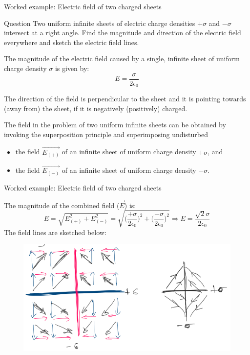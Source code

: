{
\problemslide

\begin{frame}{Worked example: Electric field of two charged sheets}

  \begin{blockexmplque}{Question}
       Two uniform infinite sheets of electric charge densities
       $+\sigma$ and $-\sigma$ intersect at a right angle.
       Find the magnitude and direction of the electric field everywhere
       and sketch the electric field lines.
  \end{blockexmplque}

  The magnitude of the electric field caused by a single, infinite sheet
  of uniform charge density $\sigma$ is given by:
  \begin{equation*}
     E = \frac{\sigma}{2\epsilon_0}
  \end{equation*}

  The direction of the field is perpendicular to the sheet and it is pointing
  towards (away from) the sheet, if it is negatively (positively) charged.

  The field in the problem of two uniform infinite sheets
  can be obtained by invoking the superposition principle
  and superimposing undisturbed
  \begin{itemize}
  \item
  the field $\vec{E_(+)}$
  of an infinite sheet of uniform charge density $+\sigma$, and
  \item
  the field $\vec{E_(-)}$
  of an infinite sheet of uniform charge density $-\sigma$.
  \end{itemize}

\end{frame}

%
%
%

\begin{frame}{Worked example: Electric field of two charged sheets}

  The magnitude of the combined field ($\vec{E}$) is:
  \begin{equation*}
     E = \sqrt{E_(+)^2 + E_(-)^2}
       = \sqrt{\Big( \frac{+\sigma}{2\epsilon_0} \Big)^2 +
               \Big( \frac{-\sigma}{2\epsilon_0} \Big)^2} \Rightarrow
     E = \frac{\sqrt{2}\sigma}{2\epsilon_0}
  \end{equation*}
  The field lines are sketched below:
  \begin{figure}[htb]
    \includegraphics[width=0.8\linewidth]{./images/problems/lect02_field_lines_of_2_charged_sheets}
  \end{figure}


\end{frame}

} %

